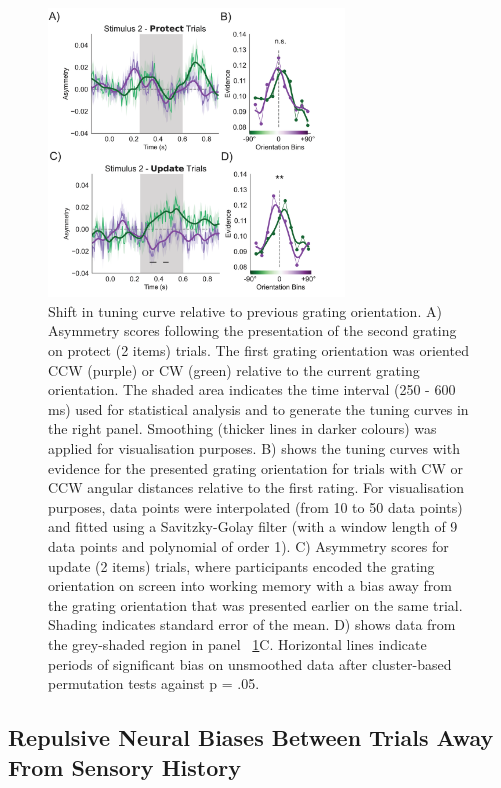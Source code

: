 \documentclass{article}
\begin{document}
\begin{large}
\begin{figure}
\centering\includegraphics[width=0.7\textwidth]{figures/figure5_within_trial_decoding} 
\caption[Shift in tuning curve relative to previous grating orientation. ]{Shift in tuning curve relative to previous grating orientation. A) Asymmetry scores following the presentation of the second grating on protect (2 items) trials. The first grating orientation was oriented CCW (purple) or CW (green) relative to the current grating orientation. The shaded area indicates the time interval (250 - 600 ms) used for statistical analysis and to generate the tuning curves in the right panel. Smoothing (thicker lines in darker colours) was applied for visualisation purposes. B) shows the tuning curves with evidence for the presented grating orientation for trials with CW or CCW angular distances relative to the first rating. For visualisation purposes, data points were interpolated (from 10 to 50 data points) and fitted using a Savitzky-Golay filter (with a window length of 9 data points and polynomial of order 1). C) Asymmetry scores for update (2 items) trials, where participants encoded the grating orientation on screen into working memory with a bias away from the grating orientation that was presented earlier on the same trial. Shading indicates standard error of the mean. D) shows data from the grey-shaded region in panel ~\ref{fig:within_decoding}C. Horizontal lines indicate periods of significant bias on unsmoothed data after cluster-based permutation tests against p = .05. }
\label{fig:within_decoding}\end{figure}

\subsection{Repulsive Neural Biases Between Trials Away From Sensory History}


\end{large}
\end{document}

